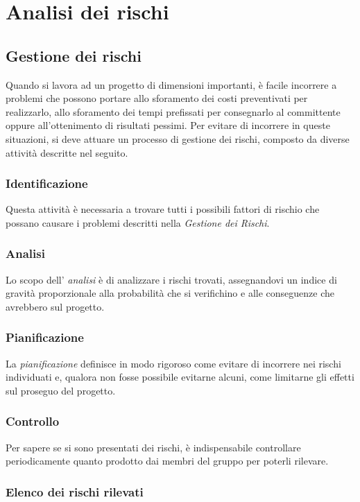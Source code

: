 \section{Analisi dei rischi}
	\subsection{Gestione dei rischi}
Quando si lavora ad un progetto di dimensioni importanti, è facile incorrere a problemi che possono portare allo sforamento dei costi preventivati per realizzarlo, allo sforamento dei tempi prefissati per consegnarlo al committente oppure all'ottenimento di risultati pessimi. \newline
Per evitare di incorrere in queste situazioni, si deve attuare un processo di gestione dei rischi, composto da diverse attività descritte nel seguito.

	\subsubsection{Identificazione}
Questa attività è necessaria a trovare tutti i possibili fattori di rischio che possano causare i problemi descritti nella \textit{Gestione dei Rischi}.

	\subsubsection{Analisi}
	 Lo scopo dell' \textit{analisi} è di analizzare i rischi trovati, assegnandovi un indice di gravità proporzionale alla probabilità che si verifichino e alle conseguenze che avrebbero sul progetto.

	\subsubsection{Pianificazione}
La \textit{pianificazione} definisce in modo rigoroso come evitare di incorrere nei rischi individuati e, qualora non fosse possibile evitarne alcuni, come limitarne gli effetti sul proseguo del progetto.

	\subsubsection{Controllo} 
 Per sapere se si sono presentati dei rischi, è indispensabile controllare periodicamente quanto prodotto dai membri del gruppo per poterli rilevare.

	\newpage
		
\subsubsection{Elenco dei rischi rilevati}

